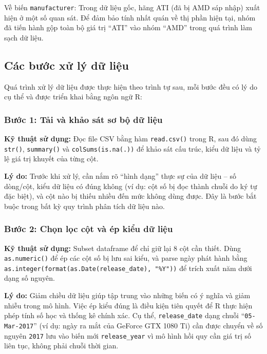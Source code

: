 \documentclass[12pt,a4paper]{article}
\begin{document}
Về biến \texttt{manufacturer}: Trong dữ liệu gốc, hãng ATI (đã bị AMD sáp nhập) xuất
hiện ở một số quan sát. Để đảm bảo tính nhất quán về thị phần hiện tại, nhóm đã tiến
hành gộp toàn bộ giá trị ``ATI'' vào nhóm ``AMD'' trong quá trình làm sạch dữ liệu.

\subsection{Các bước xử lý dữ liệu}

Quá trình xử lý dữ liệu được thực hiện theo trình tự sau, mỗi bước đều có lý do cụ thể
và được triển khai bằng ngôn ngữ R:

\subsubsection*{Bước 1: Tải và khảo sát sơ bộ dữ liệu}

\textbf{Kỹ thuật sử dụng:} Đọc file CSV bằng hàm \texttt{read.csv()} trong R, sau đó
dùng \texttt{str()}, \texttt{summary()} và \texttt{colSums(is.na(.))} để khảo sát cấu
trúc, kiểu dữ liệu và tỷ lệ giá trị khuyết của từng cột.

\textbf{Lý do:} Trước khi xử lý, cần nắm rõ ``hình dạng'' thực sự của dữ liệu -- số
dòng/cột, kiểu dữ liệu có đúng không (ví dụ: cột số bị đọc thành chuỗi do ký tự đặc
biệt), và cột nào bị thiếu nhiều đến mức không dùng được. Đây là bước bắt buộc trong
bất kỳ quy trình phân tích dữ liệu nào.

\subsubsection*{Bước 2: Chọn lọc cột và ép kiểu dữ liệu}

\textbf{Kỹ thuật sử dụng:} Subset dataframe để chỉ giữ lại 8 cột cần thiết. Dùng
\texttt{as.numeric()} để ép các cột số bị lưu sai kiểu, và parse ngày phát hành bằng
\texttt{as.integer(format(as.Date(release\_date), "\%Y"))} để trích xuất năm dưới dạng
số nguyên.

\textbf{Lý do:} Giảm chiều dữ liệu giúp tập trung vào những biến có ý nghĩa và giảm
nhiễu trong mô hình. Việc ép kiểu đúng là điều kiện tiên quyết để R thực hiện phép tính
số học và thống kê chính xác. Cụ thể, \texttt{release\_date} dạng chuỗi
``\texttt{05-Mar-2017}'' (ví dụ: ngày ra mắt của GeForce GTX 1080 Ti) cần được chuyển về
số nguyên \texttt{2017} lưu vào biến mới \texttt{release\_year} vì mô hình hồi quy cần
giá trị số liên tục, không phải chuỗi thời gian.
\end{document}
